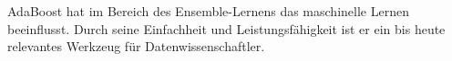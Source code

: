 AdaBoost hat im Bereich des Ensemble-Lernens das maschinelle Lernen beeinflusst. Durch seine Einfachheit
und Leistungsfähigkeit ist er ein bis heute relevantes Werkzeug für Datenwissenschaftler.